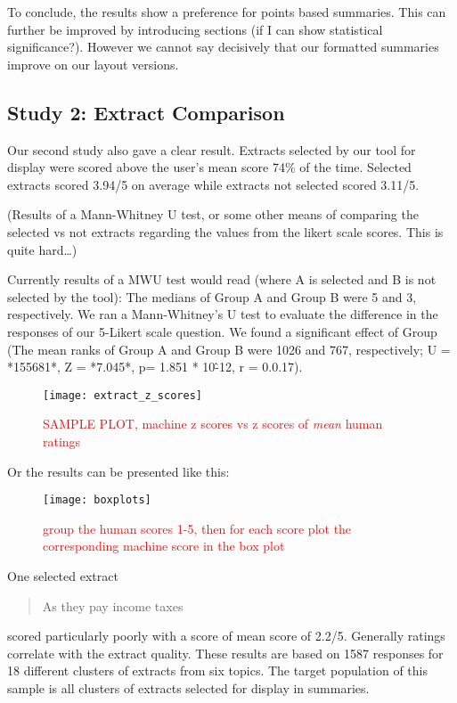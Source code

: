       To conclude, the results show a preference for points based summaries. This can further be improved by introducing sections (if I can show statistical significance?). However we cannot say decisively that our formatted summaries improve on our layout versions.

    \subsection{Study 2: Extract Comparison}
      Our second study also gave a clear result. Extracts selected by our tool for display were scored above the user's mean score 74\% of the time. Selected extracts scored 3.94/5 on average while extracts not selected scored 3.11/5.

      (Results of a Mann-Whitney U test, or some other means of comparing the selected vs not extracts regarding the values from the likert scale scores. This is quite hard\dots)

      Currently results of a MWU test would read (where A is selected and B is not selected by the tool): The medians of Group A and Group B were 5 and 3, respectively. We ran a Mann-Whitney's U test to evaluate the difference in the responses of our 5-Likert scale question. We found a significant effect of Group (The mean ranks of Group A and Group B were 1026 and 767, respectively; U = *155681*, Z = *7.045*, p= 1.851 * 10\^-12, r = 0.0.17).

      \begin{figure}[h]
        \caption{\textcolor{red}{SAMPLE PLOT, machine z scores vs z scores of \textit{mean} human ratings}}
        \centering
        \texttt{[image: extract\_z\_scores]}
      \end{figure}

      Or the results can be presented like this:
      \begin{figure}[h]
        \caption{\textcolor{red}{group the human scores 1-5, then for each score plot the corresponding machine score in the box plot}}
        \centering
        \texttt{[image: boxplots]}
      \end{figure}

      One selected extract \blockquote{As they pay income taxes} scored particularly poorly with a score of mean score of 2.2/5. Generally ratings correlate with the extract quality. These results are based on 1587 responses for 18 different clusters of extracts from six topics. The target population of this sample is all clusters of extracts selected for display in summaries.

